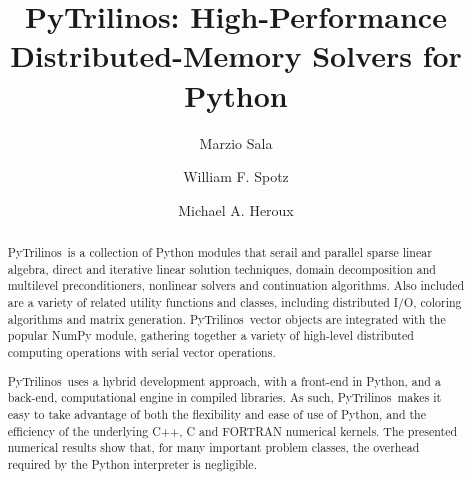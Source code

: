 \documentclass{llncs}
\newcommand{\PyTrilinos}{{\sc PyTrilinos}}
\begin{document}
\pagestyle{headings} 
\mainmatter              %

\title{\PyTrilinos: High-Performance Distributed-Memory Solvers for
       Python}

\author{Marzio Sala \and William F. Spotz \and 
  Michael A. Heroux}

%
%

\maketitle              %

\begin{abstract}
\PyTrilinos\ is a collection of Python modules 
that serail
and parallel sparse linear algebra, direct and iterative linear
solution techniques, domain decomposition and multilevel
preconditioners, nonlinear solvers and continuation algorithms. Also
included are a variety of related utility functions and classes,
including distributed I/O, coloring algorithms and matrix
generation. \PyTrilinos\ vector objects are integrated with the
popular NumPy module, gathering together a variety of
high-level distributed computing operations with serial vector
operations.

\PyTrilinos\ uses a hybrid development approach, with a front-end in Python,
and a back-end, computational engine in compiled libraries. As such,
\PyTrilinos\ makes it easy to
take advantage of both the flexibility and ease of use of Python, and the
efficiency of the underlying C++, C and FORTRAN numerical kernels.  The
presented numerical results show that, for many important problem classes, the
overhead required by the Python interpreter is negligible.
\end{abstract}
\end{document}
